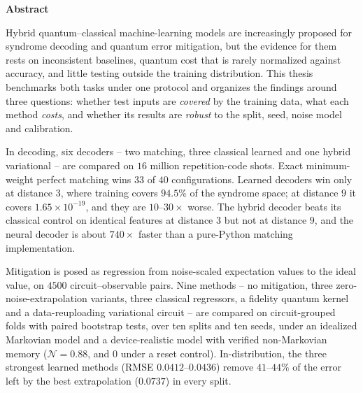 \newpage
\thispagestyle{plain}

\begin{center}
\huge{\textbf{Abstract}}
\end{center}
\vspace{0.3cm}

Hybrid quantum--classical machine-learning models are increasingly proposed for
syndrome decoding and quantum error mitigation, but the evidence for them rests on
inconsistent baselines, quantum cost that is rarely normalized against accuracy, and
little testing outside the training distribution. This thesis benchmarks both tasks
under one protocol and organizes the findings around three questions: whether test
inputs are \emph{covered} by the training data, what each method \emph{costs}, and
whether its results are \emph{robust} to the split, seed, noise model and calibration.

In decoding, six decoders -- two matching, three classical learned and one hybrid
variational -- are compared on $16$ million repetition-code shots. Exact
minimum-weight perfect matching wins $33$ of $40$ configurations. Learned decoders
win only at distance $3$, where training covers $94.5\%$ of the syndrome space; at
distance $9$ it covers $1.65 \times 10^{-19}$, and they are $10$--$30\times$ worse.
The hybrid decoder beats its classical control on identical features at distance $3$
but not at distance $9$, and the neural decoder is about $740\times$ faster than a
pure-Python matching implementation.

Mitigation is posed as regression from noise-scaled expectation values to the ideal
value, on $4500$ circuit--observable pairs. Nine methods -- no mitigation, three
zero-noise-extrapolation variants, three classical regressors, a fidelity quantum
kernel and a data-reuploading variational circuit -- are compared on circuit-grouped
folds with paired bootstrap tests, over ten splits and ten seeds, under an idealized
Markovian model and a device-realistic model with verified non-Markovian memory
($\mathcal{N} = 0.88$, and $0$ under a reset control). In-distribution, the
three strongest learned methods (RMSE $0.0412$--$0.0436$) remove $41$--$44\%$ of the
error left by the best extrapolation ($0.0737$) in every split.

